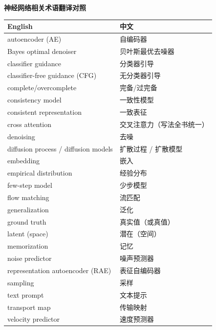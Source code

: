 \bigskip
\begin{center}
\textbf{神经网络相关术语翻译对照}

\vspace{0.3em}

\begin{tabular}{ll}
\hline
\textbf{English} & \textbf{中文} \\
\hline
autoencoder (AE) & 自编码器 \\
Bayes optimal denoiser & 贝叶斯最优去噪器 \\
classifier guidance & 分类器引导 \\
classifier-free guidance (CFG) & 无分类器引导 \\
complete/overcomplete & 完备/过完备 \\
consistency model & 一致性模型 \\
consistent representation & 一致表征 \\
cross attention & 交叉注意力（写法全书统一） \\
denoising & 去噪 \\
diffusion process / diffusion models & 扩散过程 / 扩散模型 \\
embedding & 嵌入 \\
empirical distribution & 经验分布 \\
few-step model & 少步模型 \\
flow matching & 流匹配 \\
generalization & 泛化 \\
ground truth & 真实值（或真值） \\
latent (space) & 潜在（空间） \\
memorization & 记忆 \\
noise predictor & 噪声预测器 \\
representation autoencoder (RAE) & 表征自编码器 \\
sampling & 采样 \\
text prompt & 文本提示 \\
transport map & 传输映射 \\
velocity predictor & 速度预测器 \\
\hline
\end{tabular}
\end{center}




